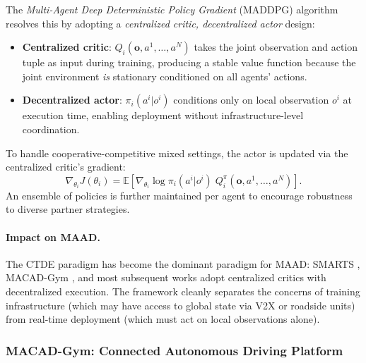 \documentclass[12pt, a4paper]{article}
\begin{document}
The \emph{Multi-Agent Deep Deterministic Policy Gradient} (MADDPG) algorithm
resolves this by adopting a \emph{centralized critic, decentralized actor} design:
\begin{itemize}[noitemsep]
  \item \textbf{Centralized critic}: $Q_i(\mathbf{o}, a^1, \dots, a^N)$ takes the
        joint observation and action tuple as input during training, producing a
        stable value function because the joint environment \emph{is} stationary
        conditioned on all agents' actions.
  \item \textbf{Decentralized actor}: $\pi_i(a^i | o^i)$ conditions only on local
        observation $o^i$ at execution time, enabling deployment without
        infrastructure-level coordination.
\end{itemize}
To handle cooperative-competitive mixed settings, the actor is updated via the
centralized critic's gradient:
\begin{equation}
  \nabla_{\theta_i} J(\theta_i)
  = \mathbb{E}\!\left[
      \nabla_{\theta_i} \log \pi_i(a^i|o^i)\;
      Q_i^\pi(\mathbf{o}, a^1, \dots, a^N)
    \right].
  \label{eq:maddpg}
\end{equation}
An ensemble of policies is further maintained per agent to encourage robustness to
diverse partner strategies.

\paragraph{Impact on MAAD.}
The CTDE paradigm has become the dominant paradigm for MAAD: SMARTS
\citep{zhou2020smarts}, MACAD-Gym \citep{palanisamy2020multi}, and most subsequent
works adopt centralized critics with decentralized execution. The framework cleanly
separates the concerns of training infrastructure (which may have access to global
state via V2X or roadside units) from real-time deployment (which must act on local
observations alone).

\subsubsection{MACAD-Gym: Connected Autonomous Driving Platform}
\label{sec:macad}
\end{document}
